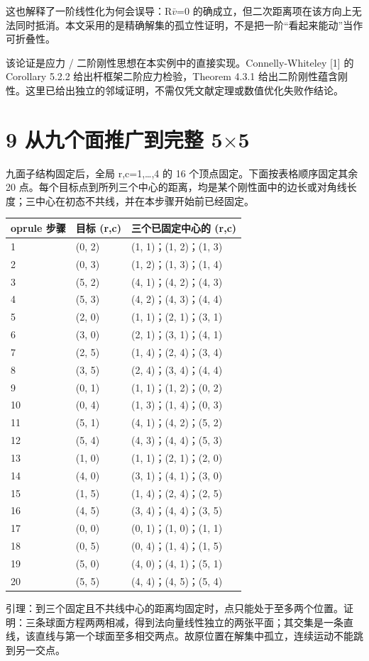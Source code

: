 \documentclass[UTF8,a4paper,11pt]{ctexart}
\begin{document}
这也解释了一阶线性化为何会误导：R\(\bar v\)=0 的确成立，但二次距离项在该方向上无法同时抵消。本文采用的是精确解集的孤立性证明，不是把一阶“看起来能动”当作可折叠性。

该论证是应力 / 二阶刚性思想在本实例中的直接实现。Connelly-Whiteley [1] 的 Corollary 5.2.2 给出杆框架二阶应力检验，Theorem 4.3.1 给出二阶刚性蕴含刚性。这里已给出独立的邻域证明，不需仅凭文献定理或数值优化失败作结论。

\newpage
\section*{9  从九个面推广到完整 5\(\times\)5}
九面子结构固定后，全局 r,c=1,…,4 的 16 个顶点固定。下面按表格顺序固定其余 20 点。每个目标点到所列三个中心的距离，均是某个刚性面中的边长或对角线长度；三中心在初态不共线，并在本步骤开始前已经固定。

\begin{longtable}{lll}	oprule
步骤 & 目标 (r,c) & 三个已固定中心的 (r,c) \\ \midrule
1 & (0, 2) & (1, 1)；(1, 2)；(1, 3) \\
2 & (0, 3) & (1, 2)；(1, 3)；(1, 4) \\
3 & (5, 2) & (4, 1)；(4, 2)；(4, 3) \\
4 & (5, 3) & (4, 2)；(4, 3)；(4, 4) \\
5 & (2, 0) & (1, 1)；(2, 1)；(3, 1) \\
6 & (3, 0) & (2, 1)；(3, 1)；(4, 1) \\
7 & (2, 5) & (1, 4)；(2, 4)；(3, 4) \\
8 & (3, 5) & (2, 4)；(3, 4)；(4, 4) \\
9 & (0, 1) & (1, 1)；(1, 2)；(0, 2) \\
10 & (0, 4) & (1, 3)；(1, 4)；(0, 3) \\
11 & (5, 1) & (4, 1)；(4, 2)；(5, 2) \\
12 & (5, 4) & (4, 3)；(4, 4)；(5, 3) \\
13 & (1, 0) & (1, 1)；(2, 1)；(2, 0) \\
14 & (4, 0) & (3, 1)；(4, 1)；(3, 0) \\
15 & (1, 5) & (1, 4)；(2, 4)；(2, 5) \\
16 & (4, 5) & (3, 4)；(4, 4)；(3, 5) \\
17 & (0, 0) & (0, 1)；(1, 0)；(1, 1) \\
18 & (0, 5) & (0, 4)；(1, 4)；(1, 5) \\
19 & (5, 0) & (4, 0)；(4, 1)；(5, 1) \\
20 & (5, 5) & (4, 4)；(4, 5)；(5, 4) \\
\bottomrule\end{longtable}
引理：到三个固定且不共线中心的距离均固定时，点只能处于至多两个位置。证明：三条球面方程两两相减，得到法向量线性独立的两张平面；其交集是一条直线，该直线与第一个球面至多相交两点。故原位置在解集中孤立，连续运动不能跳到另一交点。
\end{document}
